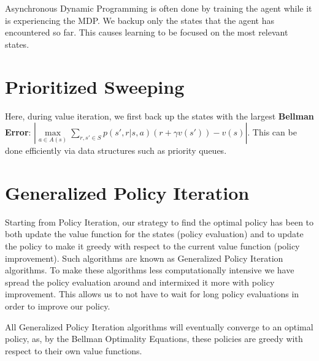 \documentclass[12pt]{report}
\begin{document}
Asynchronous Dynamic Programming is often done by training the agent while it is experiencing the MDP. We backup only the states that the agent has encountered so far. This causes learning to be focused on the most relevant states.

\section{Prioritized Sweeping}
Here, during value iteration, we first back up the states with the largest \textbf{Bellman Error}: $\left|\max\limits_{a \in A(s)}\sum\limits_{r, s' \in S} p(s', r | s, a)(r + \gamma v(s')) - v(s)\right|$. This can be done efficiently via data structures such as priority queues.

\section{Generalized Policy Iteration}
Starting from Policy Iteration, our strategy to find the optimal policy has been to both update the value function for the states (policy evaluation) and to update the policy to make it greedy with respect to the current value function (policy improvement). Such algorithms are known as 
Generalized Policy Iteration algorithms. To make these algorithms less computationally intensive we have spread the policy evaluation around and intermixed it more with policy improvement. This allows us to not have to wait for long policy evaluations in order to improve our policy.

All Generalized Policy Iteration algorithms will eventually converge to an optimal policy, as, by the Bellman Optimality Equations, these policies are greedy with respect to their own value functions.
\end{document}
